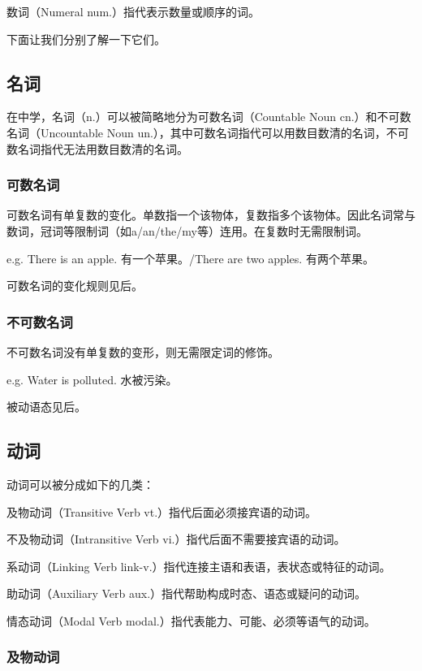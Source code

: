 \documentclass[UTF8]{ctexbook}
\begin{document}
数词（Numeral num.）指代表示数量或顺序的词。

下面让我们分别了解一下它们。

\subsection{名词}

在中学，名词（n.）可以被简略地分为可数名词（Countable Noun cn.）和不可数名词（Uncountable Noun un.），其中可数名词指代可以用数目数清的名词，不可数名词指代无法用数目数清的名词。

\subsubsection{可数名词}

可数名词有单复数的变化。单数指一个该物体，复数指多个该物体。因此名词常与数词，冠词等限制词（如a/an/the/my等）连用。在复数时无需限制词。

e.g. There is an apple. 有一个苹果。/There are two apples. 有两个苹果。

可数名词的变化规则见后。

\subsubsection{不可数名词}

不可数名词没有单复数的变形，则无需限定词的修饰。

e.g. Water is polluted. 水被污染。

被动语态见后。

\subsection{动词}

动词可以被分成如下的几类：

及物动词（Transitive Verb vt.）指代后面必须接宾语的动词。

不及物动词（Intransitive Verb vi.）指代后面不需要接宾语的动词。

系动词（Linking Verb link-v.）指代连接主语和表语，表状态或特征的动词。

助动词（Auxiliary Verb aux.）指代帮助构成时态、语态或疑问的动词。

情态动词（Modal Verb modal.）指代表能力、可能、必须等语气的动词。

\subsubsection{及物动词}
\end{document}
